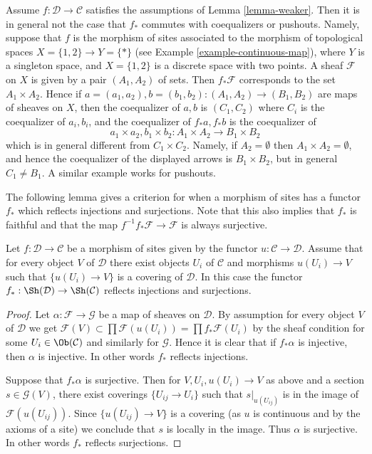 \begin{example}
\label{example-weaker-not-coequalizer}
Assume $f : \mathcal{D} \to \mathcal{C}$ satisfies the assumptions of
Lemma \ref{lemma-weaker}.
Then it is in general not the case that $f_*$ commutes with coequalizers
or pushouts. Namely, suppose that $f$ is the morphism of sites associated
to the morphism of topological spaces $X = \{1, 2\} \to Y = \{*\}$ (see
Example \ref{example-continuous-map}),
where $Y$ is a singleton space, and $X = \{1, 2\}$ is a discrete
space with two points. A sheaf $\mathcal{F}$ on $X$ is given by a pair
$(A_1, A_2)$ of sets. Then $f_*\mathcal{F}$ corresponds to the
set $A_1 \times A_2$. Hence if
$a = (a_1, a_2), b = (b_1, b_2) : (A_1, A_2) \to (B_1, B_2)$
are maps of sheaves on $X$, then the
coequalizer of $a, b$ is $(C_1, C_2)$ where $C_i$ is the coequalizer of
$a_i, b_i$, and the coequalizer of $f_*a, f_*b$ is the coequalizer of
$$
a_1 \times a_2, b_1 \times b_2 :
A_1 \times A_2 \longrightarrow B_1 \times B_2
$$
which is in general different from $C_1 \times C_2$. Namely, if
$A_2 = \emptyset$ then $A_1 \times A_2 = \emptyset$, and hence the
coequalizer of the displayed arrows is $B_1 \times B_2$, but in general
$C_1 \not = B_1$. A similar example works for pushouts.
\end{example}

\noindent
The following lemma gives a criterion for when a morphism of sites
has a functor $f_*$ which reflects injections and surjections.
Note that this also implies that $f_*$ is faithful and that the
map $f^{-1}f_*\mathcal{F} \to \mathcal{F}$ is always surjective.

\begin{lemma}
\label{lemma-cover-from-below}
Let $f : \mathcal{D} \to \mathcal{C}$ be a morphism of sites given
by the functor $u : \mathcal{C} \to \mathcal{D}$.
Assume that for every object $V$ of $\mathcal{D}$ there exist objects
$U_i$ of $\mathcal{C}$ and morphisms $u(U_i) \to V$ such that
$\{u(U_i) \to V\}$ is a covering of $\mathcal{D}$. In this case the functor
$f_* : \Sh(\mathcal{D}) \to \Sh(\mathcal{C})$ reflects
injections and surjections.
\end{lemma}

\begin{proof}
Let $\alpha : \mathcal{F} \to \mathcal{G}$ be a map of sheaves
on $\mathcal{D}$. By assumption for every object $V$ of $\mathcal{D}$
we get $\mathcal{F}(V) \subset \prod \mathcal{F}(u(U_i)) =
\prod f_*\mathcal{F}(U_i)$ by the sheaf condition
for some $U_i \in \Ob(\mathcal{C})$ and similarly for $\mathcal{G}$.
Hence it is clear that if $f_*\alpha$ is injective, then
$\alpha$ is injective. In other words $f_*$ reflects injections.

\medskip\noindent
Suppose that $f_*\alpha$ is surjective. Then for $V, U_i, u(U_i) \to V$
as above and a section $s \in \mathcal{G}(V)$, there exist coverings
$\{U_{ij} \to U_i\}$ such that $s|_{u(U_{ij})}$ is in the image
of $\mathcal{F}(u(U_{ij}))$. Since $\{u(U_{ij}) \to V\}$ is a covering
(as $u$ is continuous and by the axioms of a site) we conclude that
$s$ is locally in the image. Thus $\alpha$ is surjective. In other
words $f_*$ reflects surjections.
\end{proof}

